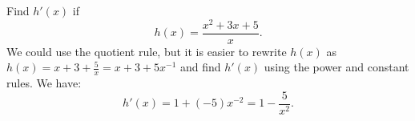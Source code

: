 \documentclass{ximera}
\begin{document}
\begin{center}
\begin{foldable}
\end{foldable}
\end{center}






\begin{example} %
Find $h'(x)$ if 
\[
h(x) = \frac{x^2 + 3x + 5}{x}.
\]
We could use the quotient rule, 
but it is easier to rewrite $h(x)$ as $h(x) = x + 3 + \frac{5}{x} = x + 3 + 5x^{-1}$ and 
find $h'(x)$ using the power and constant rules.  We have:
\[h'(x) = 1 + (-5)x^{-2} = 1 - \frac{5}{x^2}.\] 
\end{example}



\begin{center}
\begin{foldable}
\end{foldable}
\end{center}
\end{document}
